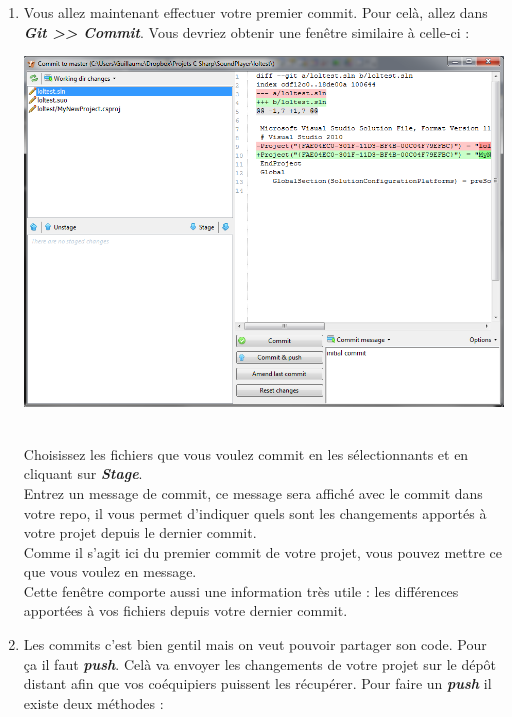 \documentclass[a4paper]{article}
\begin{document}
\begin{enumerate}
     \item Vous allez maintenant effectuer votre premier commit. Pour celà,
	 allez dans \textbf{\emph{Git >> Commit}}. Vous devriez obtenir une fenêtre
	similaire à celle-ci : \\
	\begin{center}
	    \includegraphics[scale=0.58]{img/VS_commit.png}
	\end{center}
	\\
	Choisissez les fichiers que vous voulez commit en les s\'electionnants
	et en cliquant sur \textbf{\emph{Stage}}. 
	\\
	Entrez un message de commit, ce message sera affich\'e avec le commit dans votre repo, il vous permet d'indiquer quels sont les changements apport\'es à votre projet depuis le dernier commit. 
	\\
	Comme il s'agit ici du premier commit de votre projet, vous
pouvez mettre ce que vous voulez en message. 
\\
Cette fenêtre comporte aussi une
information très utile : les diff\'erences apport\'ees à vos fichiers depuis
votre dernier commit.

\newpage

    \item Les commits c'est bien gentil mais on veut pouvoir partager son
	code. Pour ça il faut \textbf{\emph{push}}. Celà va envoyer les changements de
	votre projet sur le d\'epôt distant afin que vos co\'equipiers
	puissent les r\'ecup\'erer.
	Pour faire un \textbf{\emph{push}} il existe deux m\'ethodes : \\
	
	\begin{itemize}


\end{itemize}
\end{enumerate}
\end{document}
